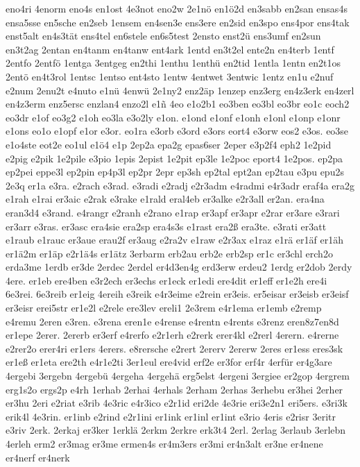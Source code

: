 {eno4ri
4enorm
eno4s
en1ost
4e3not
eno2w
2e1nö
en1ö2d
en3sabb
en2san
ensas4s
ensa5sse
en5sche
en2seb
1ensem
en4sen3e
ens3ere
en2sid
en3spo
ens4por
ens4tak
enst5alt
en4s3tät
ens4tel
en6stele
en6s5test
2ensto
enst2ü
ens3umf
en2sun
en3t2ag
2entan
en4tanm
en4tanw
ent4ark
1entd
en3t2el
ente2n
en4terb
1entf
2entfo
2entfö
1entga
3entgeg
en2thi
1enthu
1enthü
en2tid
1entla
1entn
en2t1os
2entö
en4t3rol
1entsc
1entso
ent4sto
1entw
4entwet
3entwic
1entz
en1u
e2nuf
e2num
2enu2t
e4nuto
e1nü
4enwü
2e1ny2
enz2äp
1enzep
enz3erg
en4z3erk
en4zerl
en4z3erm
enz5ersc
enzlan4
enzo2l
e1ñ
4eo
e1o2b1
eo3ben
eo3bl
eo3br
eo1c
eoch2
eo3dr
e1of
eo3g2
e1oh
eo3la
e3o2ly
e1on.
e1ond
e1onf
e1onh
e1onl
e1onp
e1onr
e1ons
eo1o
e1opf
e1or
e3or.
eo1ra
e3orb
e3ord
e3ors
eort4
e3orw
eos2
e3os.
eo3se
e1o4ste
eot2e
eo1ul
e1ö4
e1p
2ep2a
epa2g
epas6ser
2eper
e3p2f4
eph2
1e2pid
e2pig
e2pik
1e2pile
e3pio
1epis
2epist
1e2pit
ep3le
1e2poc
eport4
1e2pos.
ep2pa
ep2pei
eppe3l
ep2pin
ep4p3l
ep2pr
2epr
ep3sh
ep2tal
ept2an
ep2tau
e3pu
epu2s
2e3q
er1a
e3ra.
e2rach
e3rad.
e3radi
e2radj
e2r3adm
e4radmi
e4r3adr
eraf4a
era2g
e1rah
e1rai
er3aic
e2rak
e3rake
e1rald
eral4eb
er3alke
e2r3all
er2an.
era4na
eran3d4
e3rand.
e4rangr
e2ranh
e2rano
e1rap
er3apf
er3apr
e2rar
er3are
e3rari
er3arr
e3ras.
er3asc
era4sie
era2sp
era4s3s
e1rast
era2ß
era3te.
e3rati
er3att
e1raub
e1rauc
er3aue
erau2f
er3aug
e2ra2v
e1raw
e2r3ax
e1raz
e1rä
er1äf
er1äh
er1ä2m
er1äp
e2r1ä4s
er1ätz
3erbarm
erb2au
erb2e
erb2sp
er1c
er3chl
erch2o
erda3me
1erdb
er3de
2erdec
2erdel
er4d3en4g
erd3erw
erdeu2
1erdg
er2dob
2erdy
4ere.
er1eb
ere4ben
e3r2ech
er3echs
er1eck
er1edi
ere4dit
er1eff
er1e2h
ere4i
6e3rei.
6e3reib
er1eig
4ereih
e3reik
e4r3eime
e2rein
er3eis.
er5eisar
er3eisb
er3eisf
er3eisr
erei5str
er1e2l
e2rele
ere3lev
ereli1
2e3rem
e4r1ema
er1emb
e2remp
e4remu
2eren
e3ren.
e3rena
eren1e
e4rense
e4rentn
e4rents
e3renz
eren8z7en8d
er1epe
2erer.
2ererb
er3erf
e4rerfo
e2r1erh
e2rerk
erer4kl
e2rerl
4erern.
e4rerne
e2rer2o
erer4ri
er1ers
4erers.
e8rersche
e2rert
2ererv
2ererw
2eres
er1ess
eres3sk
er1eß
er1eta
ere2th
e4r1e2ti
3er1eul
ere4vid
erf2e
er3for
erf4r
4erfür
er4g3are
4ergebi
3ergebn
4ergebü
4ergeha
4ergehä
erg5elst
4ergeni
3ergiee
er2gop
4ergrem
erg1s2o
ergs2p
e4rh
1erhab
2erhai
4erhals
2erham
2erhas
3erhebu
er3hei
2erher
er3hu
2eri
e2riat
e3rib
4e3ric
e4r3ico
e2r1id
eri2de
4e3rie
eri3e2n1
eri5ers.
e3ri3k
erik4l
4e3rin.
er1inb
e2rind
e2r1ini
er1ink
er1inl
er1int
e3rio
4eris
e2risr
3eritr
e3riv
2erk.
2erkaj
er3ker
1erklä
2erkm
2erkre
erk3t4
2erl.
2erlag
3erlaub
3erlebn
4erleh
erm2
er3mag
er3me
ermen4s
er4m3ers
er3mi
er4n3alt
er3ne
er4nene
er4nerf
er4nerk
}
